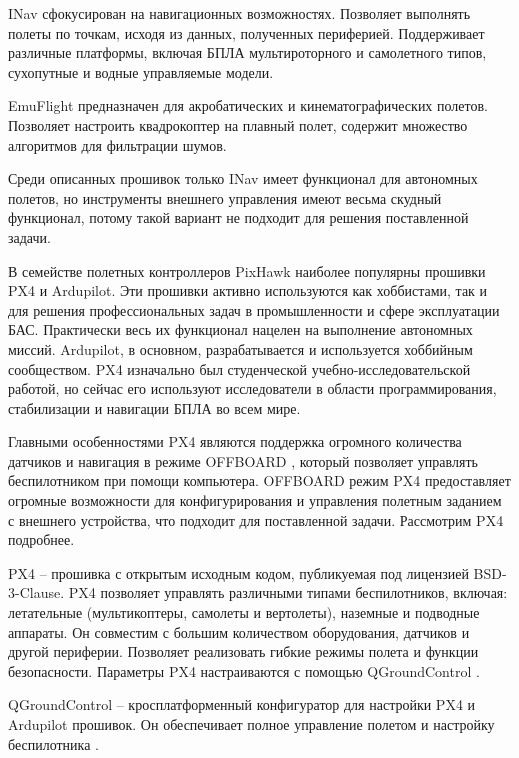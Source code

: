 INav сфокусирован на навигационных возможностях. Позволяет выполнять полеты по точкам, исходя из данных, полученных периферией. Поддерживает различные платформы, включая БПЛА мультироторного и самолетного типов, сухопутные и водные управляемые модели.

EmuFlight предназначен для акробатических и кинематографических полетов. Позволяет настроить квадрокоптер на плавный полет, содержит множество алгоритмов для фильтрации шумов.

Среди описанных прошивок только INav имеет функционал для автономных полетов, но инструменты внешнего управления имеют весьма скудный функционал, потому такой вариант не подходит для решения поставленной задачи.

В семействе полетных контроллеров PixHawk наиболее популярны прошивки PX4 и Ardupilot. Эти прошивки активно используются как хоббистами, так и для решения профессиональных задач в промышленности и сфере эксплуатации БАС. Практически весь их функционал нацелен на выполнение автономных миссий. Ardupilot, в основном, разрабатывается и используется хоббийным сообществом. PX4 изначально был студенческой учебно-исследовательской работой, но сейчас его используют исследователи в области программирования, стабилизации и навигации БПЛА во всем мире.

Главными особенностями PX4 являются поддержка огромного количества датчиков и навигация в режиме OFFBOARD \cite{px4}, который позволяет управлять беспилотником при помощи компьютера. OFFBOARD режим PX4 предоставляет огромные возможности для конфигурирования и управления полетным заданием с внешнего устройства, что подходит для поставленной задачи. Рассмотрим PX4 подробнее.


PX4 -- прошивка с открытым исходным кодом, публикуемая под лицензией BSD-3-Clause. PX4 позволяет управлять различными типами беспилотников, включая: летательные (мультикоптеры, самолеты и вертолеты), наземные и подводные аппараты. Он совместим с большим количеством оборудования, датчиков и другой периферии. Позволяет реализовать гибкие режимы полета и функции безопасности.
Параметры PX4 настраиваются с помощью Q\-Ground\-Control \cite{px4}.

QGroundControl -- кросплатформенный конфигуратор для настройки PX4 и Ardupilot прошивок. Он обеспечивает полное управление полетом и настройку беспилотника \cite{qgroundcontrol}.

